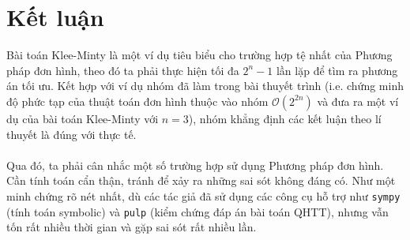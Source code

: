 \documentclass[12pt]{article}
\begin{document}
\section{Kết luận}
Bài toán Klee-Minty là một ví dụ tiêu biểu cho trường hợp tệ nhất của Phương pháp đơn hình, theo đó ta phải thực hiện tối đa $2^n - 1$ lần lặp để tìm ra phương án tối ưu. Kết hợp với ví dụ nhóm đã làm trong bài thuyết trình (i.e. chứng minh độ phức tạp của thuật toán đơn hình thuộc vào nhóm $\mathcal{O}(2^{2n})$ và đưa ra một ví dụ của bài toán Klee-Minty với $n = 3$)\cite{Nhom132022}, nhóm khẳng định các kết luận theo lí thuyết là đúng với thực tế.\\\\
Qua đó, ta phải cân nhắc một số trường hợp sử dụng Phương pháp đơn hình. Cần tính toán cẩn thận, tránh để xảy ra những sai sót không đáng có. Như một minh chứng rõ nét nhất, dù các tác giả đã sử dụng các công cụ hỗ trợ như \texttt{sympy} (tính toán symbolic) và \texttt{pulp} (kiểm chứng đáp án bài toán QHTT), nhưng vẫn tốn rất nhiều thời gian và gặp sai sót rất nhiều lần.
\cleardoublepage
{}
{}


\end{document}
